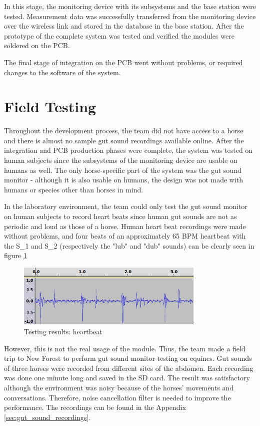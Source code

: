 In this stage, the monitoring device with its subsystems and the base station were tested. Measurement data was successfully transferred from the monitoring device over the wireless link and stored in the database in the base station. After the prototype of the complete system was tested and verified the modules were soldered on the PCB.

The final stage of integration on the PCB went without problems, or required changes to the software of the system.  



\section{Field Testing}
Throughout the development process, the team did not have access to a horse and there is almost no sample gut sound recordings available online. After the integration and PCB production phases were complete, the system was tested on human subjects since the subsystems of the monitoring device are usable on humans as well. The only horse-specific part of the system was the gut sound monitor - although it is also usable on humans, the design was not made with humans or species other than horses in mind. 

In the laboratory environment, the team could only test the gut sound monitor on human subjects to record heart beats since human gut sounds are not as periodic and loud as those of a horse. Human heart beat recordings were made without problems, and four beats of an approximately 65 BPM heartbeat with the S\_1 and S\_2 (respectively the "lub" and "dub" sounds) can be clearly seen in figure \ref{fig:heartbeat}

\begin{figure}
\centering
\includegraphics[width=0.8\textwidth]{Images/heartbeat.png}
\caption{Testing results: heartbeat}
\label{fig:heartbeat}
\end{figure}

However, this is not the real usage of the module. Thus, the team made a field trip to New Forest to perform gut sound monitor testing on equines. Gut sounds of three horses were recorded from different sites of the abdomen. Each recording was done one minute long and saved in the SD card. The result was satisfactory although the environment was noisy because of the horses' movements and conversations. Therefore, noise cancellation filter is needed to improve the performance. The recordings can be found in the Appendix \ref{sec:gut_sound_recordings}.

